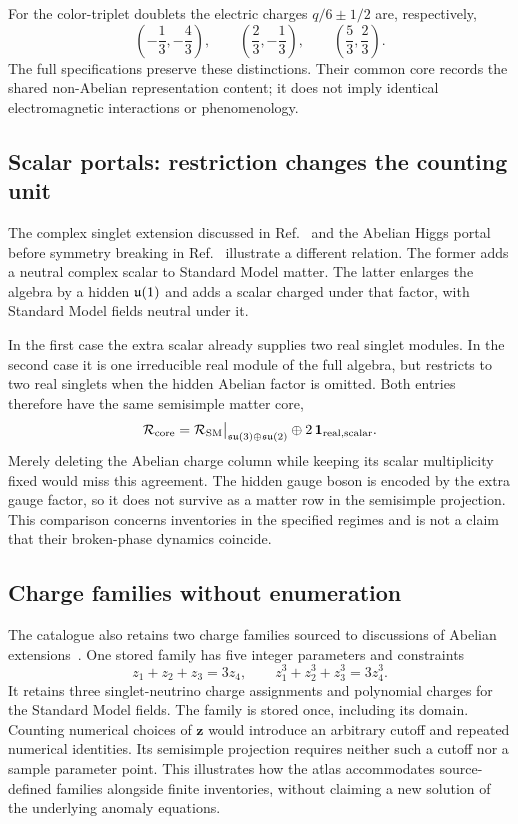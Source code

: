 For the color-triplet doublets the electric charges $q/6\pm1/2$ are, respectively,
\[
\left(-\frac13,-\frac43\right),\qquad
\left(\frac23,-\frac13\right),\qquad
\left(\frac53,\frac23\right).
\]
The full specifications preserve these distinctions. Their common core records the shared non-Abelian representation content; it does not imply identical electromagnetic interactions or phenomenology.

\subsection{Scalar portals: restriction changes the counting unit}
\label{sec:portal}

The complex singlet extension discussed in Ref.~\cite{ScalarSinglet} and the Abelian Higgs portal before symmetry breaking in Ref.~\cite{VectorPortal} illustrate a different relation. The former adds a neutral complex scalar to Standard Model matter. The latter enlarges the algebra by a hidden $\mathfrak{u}(1)$ and adds a scalar charged under that factor, with Standard Model fields neutral under it.

In the first case the extra scalar already supplies two real singlet modules. In the second case it is one irreducible real module of the full algebra, but restricts to two real singlets when the hidden Abelian factor is omitted. Both entries therefore have the same semisimple matter core,
\begin{equation}
\mathcal R_{\mathrm{core}}=
\mathcal{R}_{\mathrm{SM}}\big|_{\mathfrak{su}(3)\oplus\mathfrak{su}(2)}\oplus
2\,\mathbf1_{\mathrm{real,scalar}}.
\end{equation}
Merely deleting the Abelian charge column while keeping its scalar multiplicity fixed would miss this agreement. The hidden gauge boson is encoded by the extra gauge factor, so it does not survive as a matter row in the semisimple projection. This comparison concerns inventories in the specified regimes and is not a claim that their broken-phase dynamics coincide.

\subsection{Charge families without enumeration}

The catalogue also retains two charge families sourced to discussions of Abelian extensions~\cite{Langacker,AnomalyAtlas}. One stored family has five integer parameters and constraints
\begin{equation}
z_1+z_2+z_3=3z_4,\qquad
z_1^3+z_2^3+z_3^3=3z_4^3.
\end{equation}
It retains three singlet-neutrino charge assignments and polynomial charges for the Standard Model fields. The family is stored once, including its domain. Counting numerical choices of $\mathbf z$ would introduce an arbitrary cutoff and repeated numerical identities. Its semisimple projection requires neither such a cutoff nor a sample parameter point. This illustrates how the atlas accommodates source-defined families alongside finite inventories, without claiming a new solution of the underlying anomaly equations.

